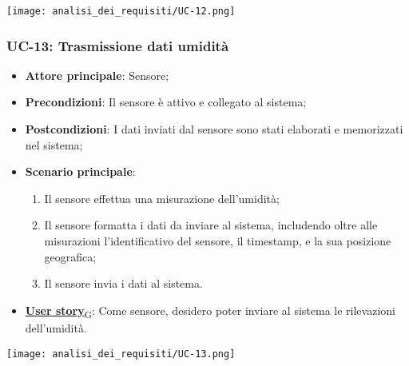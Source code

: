 \begin{center}
	\texttt{[image: analisi\_dei\_requisiti/UC-12.png]}
\end{center}

\subsubsection{UC-13: Trasmissione dati umidità}
\begin{itemize}
	\item \textbf{Attore principale}: Sensore;
	\item \textbf{Precondizioni}: Il sensore è attivo e collegato al sistema;
	\item \textbf{Postcondizioni}: I dati inviati dal sensore sono stati elaborati e memorizzati nel sistema;
	\item \textbf{Scenario principale}:
	      \begin{enumerate}
		      \item Il sensore effettua una misurazione dell'umidità;
		      \item Il sensore formatta i dati da inviare al sistema, includendo oltre alle misurazioni l'identificativo del sensore,
		            il timestamp, e la sua posizione geografica;
		      \item Il sensore invia i dati al sistema.
	      \end{enumerate}
	\item \href{https://7last.github.io/docs/rtb/documentazione-interna/glossario\#user-story}{\textbf{User story}\textsubscript{G}}: Come sensore, desidero poter inviare al sistema le rilevazioni dell'umidità.
\end{itemize}

\begin{center}
	\texttt{[image: analisi\_dei\_requisiti/UC-13.png]}
\end{center}

